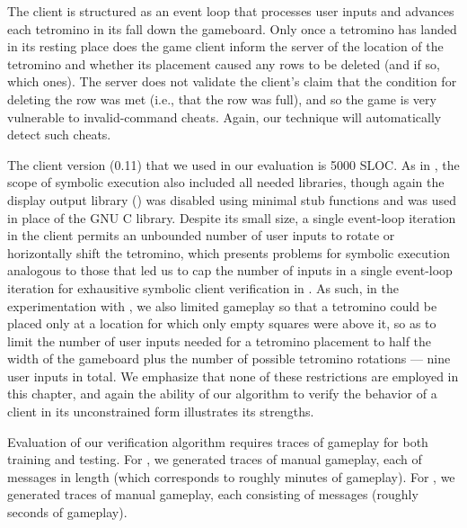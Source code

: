 The \tetrinet client is structured as an event loop that processes
user inputs and advances each tetromino in its fall down the
gameboard.  Only once a tetromino has landed in its resting place does
the game client inform the server of the location of the tetromino and
whether its placement caused any rows to be deleted (and if so, which
ones).  The server does not validate the client's claim that the
condition for deleting the row was met (i.e., that the row was full),
and so the game is very vulnerable to invalid-command cheats.  Again,
our technique will automatically detect such cheats.

The \tetrinet client version (0.11) that we used in our evaluation is
5000 SLOC.  As in \xpilot, the scope of symbolic execution also 
included all needed libraries, though again the display output library
(\ncurses) was disabled using minimal stub functions and \uclibc was
used in place of the GNU C library.
Despite its small size, a single event-loop iteration in the
\tetrinet client permits an unbounded number of user inputs to rotate
or horizontally shift the tetromino, which presents problems for
symbolic execution analogous to those that led us to cap
the number of inputs in a single \xpilot event-loop iteration for
exhausitive symbolic client verification in . As
such, in the experimentation with \tetrinet, we also limited
gameplay so that a tetromino could be placed only at a location for
which only empty squares were above it, so as to limit the number of
user inputs needed for a tetromino placement to half the width of the
gameboard plus the number of possible tetromino rotations --- nine
user inputs in total.  We emphasize that none of
these restrictions are employed in this chapter, and again the
ability of our algorithm to verify the behavior of a \tetrinet client
in its unconstrained form illustrates its strengths.

\label{sec:guided:eval:results}

Evaluation of our verification algorithm requires traces of gameplay
for both training and testing.  For \tetrinet, we generated
\tetrinetTraces traces of manual gameplay, each of
\tetrinetTraceLength messages in length (which corresponds to roughly
\tetrinetTraceMins minutes of gameplay).  For \xpilot, we generated
\xpilotTraces traces of manual gameplay, each consisting of
\xpilotTraceLength messages (roughly \xpilotTraceSecs seconds of
gameplay).

